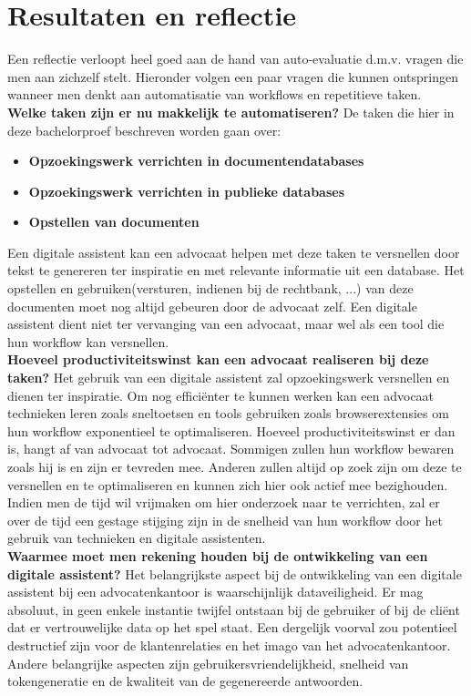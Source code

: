 \chapter{Resultaten en reflectie}
\label{ch:results_reflection}
Een reflectie verloopt heel goed aan de hand van auto-evaluatie d.m.v. vragen die men aan zichzelf stelt. 
Hieronder volgen een paar vragen die kunnen ontspringen wanneer men denkt aan automatisatie van workflows en repetitieve taken.\\ 

\textbf{Welke taken zijn er nu makkelijk te automatiseren?}
De taken die hier in deze bachelorproef beschreven worden gaan over:
\begin{itemize}
	\item \textbf{Opzoekingswerk verrichten in documentendatabases}
	\item \textbf{Opzoekingswerk verrichten in publieke databases}
	\item \textbf{Opstellen van documenten}
\end{itemize}
Een digitale assistent kan een advocaat helpen met deze taken te versnellen door tekst te genereren ter inspiratie en met relevante informatie uit een database. 
Het opstellen en gebruiken(versturen, indienen bij de rechtbank, ...) van deze documenten moet nog altijd gebeuren door de advocaat zelf. 
Een digitale assistent dient niet ter vervanging van een advocaat, maar wel als een tool die hun workflow kan versnellen. \\ 

\textbf{Hoeveel productiviteitswinst kan een advocaat realiseren bij deze taken?}
Het gebruik van een digitale assistent zal opzoekingswerk versnellen en dienen ter inspiratie. 
Om nog efficiënter te kunnen werken kan een advocaat technieken leren zoals sneltoetsen en tools gebruiken zoals browserextensies om hun workflow exponentieel te optimaliseren. 
Hoeveel productiviteitswinst er dan is, hangt af van advocaat tot advocaat. 
Sommigen zullen hun workflow bewaren zoals hij is en zijn er tevreden mee. 
Anderen zullen altijd op zoek zijn om deze te versnellen en te optimaliseren en kunnen zich hier ook actief mee bezighouden. 
Indien men de tijd wil vrijmaken om hier onderzoek naar te verrichten, zal er over de tijd een gestage stijging 
zijn in de snelheid van hun workflow door het gebruik van technieken en digitale assistenten. \\ 

\textbf{Waarmee moet men rekening houden bij de ontwikkeling van een digitale assistent?}
Het belangrijkste aspect bij de ontwikkeling van een digitale assistent bij een advocatenkantoor is waarschijnlijk dataveiligheid. 
Er mag absoluut, in geen enkele instantie twijfel ontstaan bij de gebruiker of bij de cliënt dat er vertrouwelijke data op het spel staat.  
Een dergelijk voorval zou potentieel destructief zijn voor de klantenrelaties en het imago van het advocatenkantoor. 
Andere belangrijke aspecten zijn gebruikersvriendelijkheid, snelheid van tokengeneratie en de kwaliteit van de gegenereerde antwoorden.\\ 


